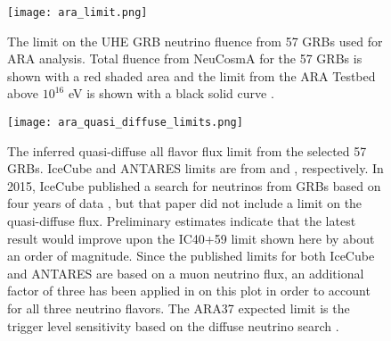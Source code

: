 \documentclass[12pt]{article}
\begin{document}
\begin{doublespace}
\begin{figure}[H]
\centering
\texttt{[image: ara\_limit.png]}
\caption{The limit on the UHE GRB neutrino fluence from 57 GRBs used for ARA analysis. Total fluence from NeuCosmA for the 57 GRBs is shown with a red shaded area and the limit from the ARA Testbed above $10^{16}$ eV is shown with a black solid curve \cite{araproto}.}
\label{arafluence}
\centering
\texttt{[image: ara\_quasi\_diffuse\_limits.png]}
\caption{The inferred quasi-diffuse all flavor flux limit from the selected 57 GRBs. IceCube and ANTARES limits are from \cite{IC2012} and \cite{antaresmuon}, respectively. In 2015, IceCube published a search for neutrinos from GRBs based on four years of data \cite{IC2015}, but that paper did not include a limit on the quasi-diffuse flux. Preliminary estimates indicate that the latest result would improve upon the IC40+59 limit \cite{IC2012} shown here by about an order of magnitude. Since the published limits for both IceCube and ANTARES are based on a muon neutrino flux, an additional factor of three has been applied in \cite{araproto} on this plot in order to account for all three neutrino flavors. The ARA37 expected limit is the trigger level sensitivity based on the diffuse neutrino search \cite{araprotofirst}.}
\label{araquasiflux}
\end{figure}


\begin{singlespace}

\end{singlespace}
\end{doublespace}
\end{document}
